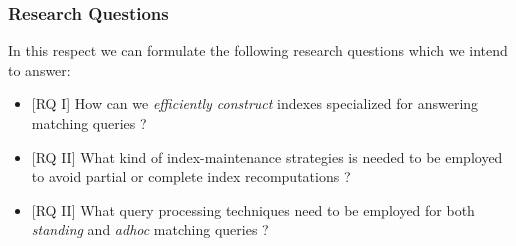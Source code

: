 \documentclass{scrartcl}
\begin{document}
\subsubsection{Research Questions} 	
In this respect we can formulate the following research questions which we intend to answer:
\begin{itemize}
	\item \textsf{[RQ I]} How can we \emph{efficiently construct} indexes specialized for answering matching queries ? 

	\item \textsf{[RQ II]} What kind of index-maintenance strategies is needed to be employed to avoid partial or complete index recomputations ?

	\item \textsf{[RQ II]} What query processing techniques need to be employed for both \emph{standing} and \emph{adhoc} matching queries ?

\end{itemize}



%
%
\end{document}
